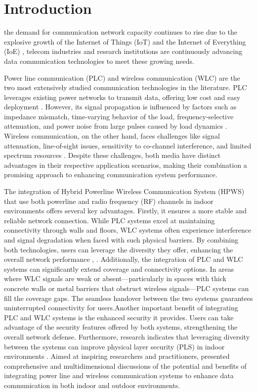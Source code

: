 \documentclass[lettersize,journal]{IEEEtran}
\begin{document}
	\section{Introduction}
	\label{sec:intro}
	 the demand for communication network capacity continues to rise due to the explosive growth of the Internet of Things (IoT) and the Internet of Everything (IoE) \cite{6714496, 8076908, 9902969}, telecom industries and research institutions are continuously advancing data communication technologies to meet these growing needs.
	
	Power line communication (PLC) \cite{8760230, 8995538, DEOLIVEIRA2022107168} and wireless communication (WLC) \cite{9887796, 9961877, 9900419} are the two most extensively studied communication technologies in the literature. PLC leverages existing power networks to transmit data, offering low cost and easy deployment \cite{doi:10.1049/PBPO132E, 10.5555/3055710}. However, its signal propagation is influenced by factors such as impedance mismatch, time-varying behavior of the load, frequency-selective attenuation, and power noise from large pulses caused by load dynamics \cite{article, electronics8091022, 9239378}. Wireless communication, on the other hand, faces challenges like signal attenuation, line-of-sight issues, sensitivity to co-channel interference, and limited spectrum resources \cite{7467419, 920866, 10.5555/559977}. Despite these challenges, both media have distinct advantages in their respective application scenarios, making their combination a promising approach to enhancing communication system performance.
	
	The integration of Hybrid Powerline Wireless Communication System (HPWS) that use both powerline and radio frequency (RF) channels in indoor environments offers several key advantages. Firstly, it ensures a more stable and reliable network connection. While PLC systems excel at maintaining connectivity through walls and floors, WLC systems often experience interference and signal degradation when faced with such physical barriers. By combining both technologies, users can leverage the diversity they offer, enhancing the overall network performance \cite{6575217}, \cite{5502091}. Additionally, the integration of PLC and WLC systems can significantly extend coverage and connectivity options. In areas where WLC signals are weak or absent—particularly in spaces with thick concrete walls or metal barriers that obstruct wireless signals—PLC systems can fill the coverage gaps. The seamless handover between the two systems guarantees uninterrupted connectivity for users.Another important benefit of integrating PLC and WLC systems is the enhanced security it provides. Users can take advantage of the security features offered by both systems, strengthening the overall network defense. Furthermore, research indicates that leveraging diversity between the systems can improve physical layer security (PLS) in indoor environments \cite{BORBOR201996}. Aimed at inspiring researchers and practitioners, \cite{10298615}  presented comprehensive and multidimensional discussions of the potential and beneﬁts of integrating power line and wireless communication systems to enhance data communication in both indoor and outdoor environments.
	
\end{document}
